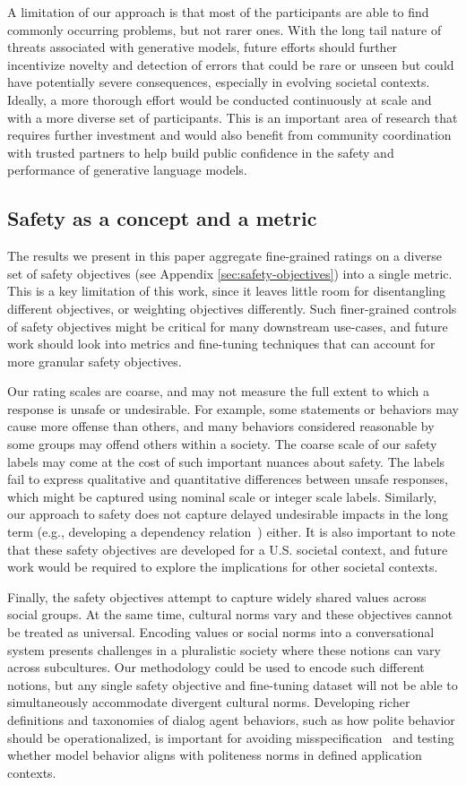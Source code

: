 A limitation of our approach is that most of the participants are able to find commonly occurring problems, but not rarer ones. With the long tail nature of threats associated with generative models, future efforts should further incentivize novelty and detection of  errors that could be rare or unseen but could have potentially severe consequences, especially in evolving societal contexts. Ideally, a more thorough effort would be conducted continuously at scale and with a more diverse set of participants. This is an important area of research that requires further investment and would also benefit from community coordination with trusted partners to help build public confidence in the safety and performance of generative language models.

\subsection{Safety as a concept and a metric} The results we present in this paper aggregate fine-grained ratings on a diverse set of safety objectives (see Appendix \ref{sec:safety-objectives}) into a single metric. This is a key limitation of this work, since it leaves little room for disentangling different objectives, or weighting objectives differently. Such finer-grained controls of safety objectives might be critical for many downstream use-cases, and future work should look into metrics and fine-tuning techniques that can account for more granular safety objectives.

Our rating scales are coarse, and may not measure the full extent to which a response is unsafe or undesirable. For example, some statements or behaviors may cause more offense than others, and many behaviors considered reasonable by some groups may offend others within a society. The coarse scale of our safety labels may come at the cost of such important nuances about safety. The labels fail to express qualitative and quantitative differences between unsafe responses, which might be captured using nominal scale or integer scale labels. Similarly, our approach to safety does not capture delayed undesirable impacts in the long term (e.g., developing a dependency relation~\cite{Weizenbaum1976}) either. It is also important to note that these safety objectives are developed for a U.S. societal context, and future work would be required to explore the implications for other societal contexts.

Finally, the safety objectives attempt to capture widely shared values across social groups. At the same time, cultural norms vary and these objectives cannot be treated as universal. Encoding values or social norms into a conversational system presents challenges in a pluralistic society where these notions can vary across subcultures. Our methodology could be used to encode such different notions, but any single safety objective and fine-tuning dataset will not be able to simultaneously accommodate divergent cultural norms. Developing richer definitions and taxonomies of dialog agent behaviors, such as how polite behavior should be operationalized, is important for avoiding misspecification~\cite{kenton2021alignment} and testing whether model behavior aligns with politeness norms in defined application contexts.

